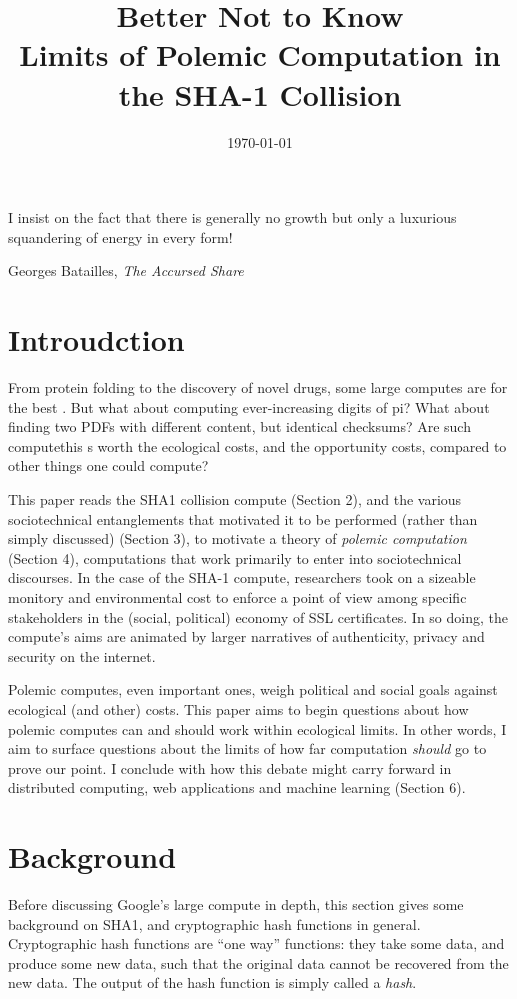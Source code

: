 \documentclass[sigconf]{acmart}
\date{\today}
\title{Better Not to Know\\\medskip
\large Limits of Polemic Computation in the SHA-1 Collision}
\begin{document}
\maketitle

\epigraph{I insist on the fact that there is generally no growth but only a luxurious squandering of energy in every form!}{Georges Batailles, \textit{The Accursed Share}}

\section{Introudction}
\label{sec:orgd80f742}

From protein folding to the discovery of novel drugs,
some large computes are for the best
\cite{Anderson2004}.
But what about computing ever-increasing digits of pi?
What about finding two PDFs with different content, but identical checksums?
Are such computethis s worth
the ecological costs, and the opportunity costs, compared to other things one could compute?

This paper reads the SHA1 collision compute (Section 2), and the various sociotechnical entanglements that motivated it to be performed (rather than simply discussed) (Section 3),
to motivate a theory of \emph{polemic computation} (Section 4), 
computations that
work primarily to enter into sociotechnical discourses.
In the case of the SHA-1 compute, researchers took on a sizeable monitory and environmental cost
to enforce a point of view among specific stakeholders in the (social, political) economy of SSL certificates.
In so doing, the compute's aims are animated by
larger narratives of authenticity, privacy and security on the internet.

Polemic computes, even important ones, weigh political and social goals against ecological (and other) costs.
This paper aims to begin questions about how polemic computes can and should work within ecological limits.
In other words, I aim to surface questions about the limits of how far computation \emph{should} go to prove our point.
I conclude with how this debate might carry forward in distributed computing, web applications and machine learning (Section 6).


\section{Background}
\label{sec:orgbc61ee9}


Before discussing Google's large compute in depth,
this section gives some background on SHA1, and cryptographic hash functions in general.
Cryptographic hash functions are ``one way'' functions: 
they take some data, and produce some new data, such that the original data cannot be recovered from the new data. The output of the hash function is simply called a \emph{hash}.
\end{document}
